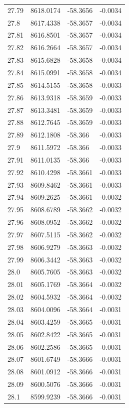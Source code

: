 \begin{table}[H]
\begin{tabular}{llll}
27.79 & 8618.0174 & -58.3656 & -0.0034 \\
27.8 & 8617.4338 & -58.3657 & -0.0034 \\
27.81 & 8616.8501 & -58.3657 & -0.0034 \\
27.82 & 8616.2664 & -58.3657 & -0.0034 \\
27.83 & 8615.6828 & -58.3658 & -0.0034 \\
27.84 & 8615.0991 & -58.3658 & -0.0034 \\
27.85 & 8614.5155 & -58.3658 & -0.0033 \\
27.86 & 8613.9318 & -58.3659 & -0.0033 \\
27.87 & 8613.3481 & -58.3659 & -0.0033 \\
27.88 & 8612.7645 & -58.3659 & -0.0033 \\
27.89 & 8612.1808 & -58.366 & -0.0033 \\
27.9 & 8611.5972 & -58.366 & -0.0033 \\
27.91 & 8611.0135 & -58.366 & -0.0033 \\
27.92 & 8610.4298 & -58.3661 & -0.0033 \\
27.93 & 8609.8462 & -58.3661 & -0.0033 \\
27.94 & 8609.2625 & -58.3661 & -0.0032 \\
27.95 & 8608.6789 & -58.3662 & -0.0032 \\
27.96 & 8608.0952 & -58.3662 & -0.0032 \\
27.97 & 8607.5115 & -58.3662 & -0.0032 \\
27.98 & 8606.9279 & -58.3663 & -0.0032 \\
27.99 & 8606.3442 & -58.3663 & -0.0032 \\
28.0 & 8605.7605 & -58.3663 & -0.0032 \\
28.01 & 8605.1769 & -58.3664 & -0.0032 \\
28.02 & 8604.5932 & -58.3664 & -0.0032 \\
28.03 & 8604.0096 & -58.3664 & -0.0031 \\
28.04 & 8603.4259 & -58.3665 & -0.0031 \\
28.05 & 8602.8422 & -58.3665 & -0.0031 \\
28.06 & 8602.2586 & -58.3665 & -0.0031 \\
28.07 & 8601.6749 & -58.3666 & -0.0031 \\
28.08 & 8601.0912 & -58.3666 & -0.0031 \\
28.09 & 8600.5076 & -58.3666 & -0.0031 \\
28.1 & 8599.9239 & -58.3666 & -0.0031 \\

\end{tabular}
\end{table}

